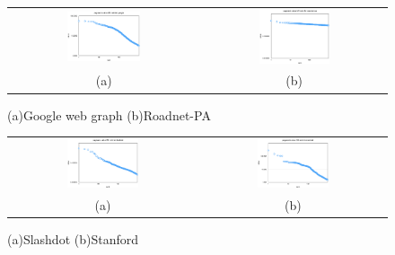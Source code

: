 \begin{figure}[h]
\begin{center}
\begin{tabular}{cc}
     \includegraphics[width=0.4\textwidth]{FIG/t2_google.png} &
     \includegraphics[width=0.4\textwidth]{FIG/t2_pa.png} \\
    (a) & (b) 
\end{tabular}
\caption{(a)Google web graph (b)Roadnet-PA}
\label{t2:3}
\end{center}
\end{figure}

\begin{figure}[h]
\begin{center}
\begin{tabular}{cc}
     \includegraphics[width=0.4\textwidth]{FIG/t2_slashdot.png} &
     \includegraphics[width=0.4\textwidth]{FIG/t2_stanford.png} \\
    (a) & (b) 
\end{tabular}
\caption{(a)Slashdot (b)Stanford}
\label{t2:4}
\end{center}
\end{figure}

